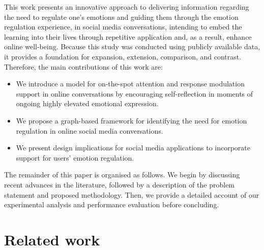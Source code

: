 \documentclass[acmtog]{acmart}
\begin{document}
This work presents an innovative approach to delivering information regarding the need to regulate one's emotions and guiding them through the emotion regulation experience, in social media conversations, intending to embed the learning into their lives through repetitive application and, as a result, enhance online well-being. Because this study was conducted using publicly available data, it provides a foundation for expansion, extension, comparison, and contrast. Therefore, the main contributions of this work are:
\begin{itemize}
    \item We introduce a model for on-the-spot attention and response modulation support in online conversations by encouraging self-reflection in moments of ongoing highly elevated emotional expression.
    \item We propose a graph-based framework for identifying the need for emotion regulation in online social media conversations.
    \item We present design implications for social media applications to incorporate support for users' emotion regulation.
\end{itemize}
The remainder of this paper is organised as follows. We begin by discussing recent advances in the literature, followed by a description of the problem statement and proposed methodology. Then, we provide a detailed account of our experimental analysis and performance evaluation before concluding.


\section{Related work}
\end{document}
